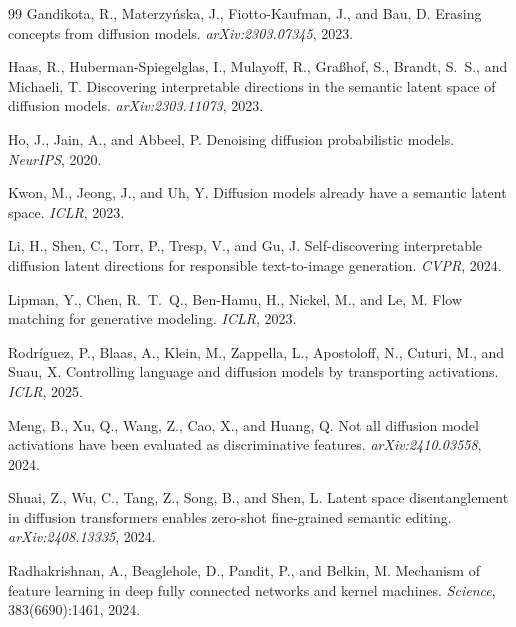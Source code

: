 \documentclass[11pt]{article}
\begin{document}
\begin{thebibliography}{99}
Gandikota, R., Materzy\'{n}ska, J., Fiotto-Kaufman, J., and Bau, D.
\newblock Erasing concepts from diffusion models.
\newblock \emph{arXiv:2303.07345}, 2023.

Haas, R., Huberman-Spiegelglas, I., Mulayoff, R., Gra{\ss}hof, S., Brandt, S.~S., and Michaeli, T.
\newblock Discovering interpretable directions in the semantic latent space of diffusion models.
\newblock \emph{arXiv:2303.11073}, 2023.

Ho, J., Jain, A., and Abbeel, P.
\newblock Denoising diffusion probabilistic models.
\newblock \emph{NeurIPS}, 2020.

Kwon, M., Jeong, J., and Uh, Y.
\newblock Diffusion models already have a semantic latent space.
\newblock \emph{ICLR}, 2023.

Li, H., Shen, C., Torr, P., Tresp, V., and Gu, J.
\newblock Self-discovering interpretable diffusion latent directions for responsible text-to-image generation.
\newblock \emph{CVPR}, 2024.

Lipman, Y., Chen, R.~T.~Q., Ben-Hamu, H., Nickel, M., and Le, M.
\newblock Flow matching for generative modeling.
\newblock \emph{ICLR}, 2023.

Rodr\'{i}guez, P., Blaas, A., Klein, M., Zappella, L., Apostoloff, N., Cuturi, M., and Suau, X.
\newblock Controlling language and diffusion models by transporting activations.
\newblock \emph{ICLR}, 2025.

Meng, B., Xu, Q., Wang, Z., Cao, X., and Huang, Q.
\newblock Not all diffusion model activations have been evaluated as discriminative features.
\newblock \emph{arXiv:2410.03558}, 2024.

Shuai, Z., Wu, C., Tang, Z., Song, B., and Shen, L.
\newblock Latent space disentanglement in diffusion transformers enables zero-shot fine-grained semantic editing.
\newblock \emph{arXiv:2408.13335}, 2024.

Radhakrishnan, A., Beaglehole, D., Pandit, P., and Belkin, M.
\newblock Mechanism of feature learning in deep fully connected networks and kernel machines.
\newblock \emph{Science}, 383(6690):1461, 2024.


\end{thebibliography}
\end{document}
